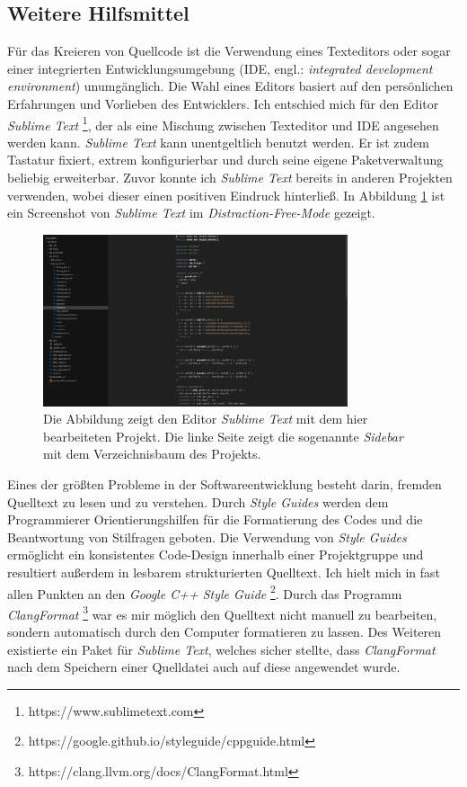 \documentclass[crop=false]{standalone}
\begin{document}
  \subsection{Weitere Hilfsmittel} %
  \label{sub:weitere_hilfsmittel}
    Für das Kreieren von Quellcode ist die Verwendung eines Texteditors oder sogar einer integrierten Entwicklungsumgebung (IDE, engl.: \textit{integrated development environment}) unumgänglich.
    Die Wahl eines Editors basiert auf den persönlichen Erfahrungen und Vorlieben des Entwicklers.
    Ich entschied mich für den Editor \textit{Sublime Text}%
    \footnote{https://www.sublimetext.com}, der als eine Mischung zwischen Texteditor und IDE angesehen werden kann.
    \textit{Sublime Text} kann unentgeltlich benutzt werden.
    Er ist zudem Tastatur fixiert, extrem konfigurierbar und durch seine eigene Paketverwaltung beliebig erweiterbar.
    Zuvor konnte ich \textit{Sublime Text} bereits in anderen Projekten verwenden, wobei dieser einen positiven Eindruck hinterließ.
    In Abbildung \ref{fig:sublime-text-example} ist ein Screenshot von \textit{Sublime Text} im \textit{Distraction-Free-Mode} gezeigt.
    \begin{figure}[h]
      \center
      \includegraphics[width=0.8\textwidth]{images/sublime_text_example.png}
      \caption{%
        Die Abbildung zeigt den Editor \textit{Sublime Text} mit dem hier bearbeiteten Projekt.
        Die linke Seite zeigt die sogenannte \textit{Sidebar} mit dem Verzeichnisbaum des Projekts.
      }
      \label{fig:sublime-text-example}
    \end{figure}

    Eines der größten Probleme in der Softwareentwicklung besteht darin, fremden Quelltext zu lesen und zu verstehen.
    Durch \textit{Style Guides} werden dem Programmierer Orientierungshilfen für die Formatierung des Codes und die Beantwortung von Stilfragen geboten.
    Die Verwendung von \textit{Style Guides} ermöglicht ein konsistentes Code-Design innerhalb einer Projektgruppe und resultiert außerdem in lesbarem strukturierten Quelltext.
    Ich hielt mich in fast allen Punkten an den \textit{Google C++ Style Guide}%
    \footnote{https://google.github.io/styleguide/cppguide.html}.
    Durch das Programm \textit{ClangFormat}%
    \footnote{https://clang.llvm.org/docs/ClangFormat.html}
    war es mir möglich den Quelltext nicht manuell zu bearbeiten, sondern automatisch durch den Computer formatieren zu lassen.
    Des Weiteren existierte ein Paket für \textit{Sublime Text}, welches sicher stellte, dass \textit{ClangFormat} nach dem Speichern einer Quelldatei auch auf diese angewendet wurde.

\end{document}
